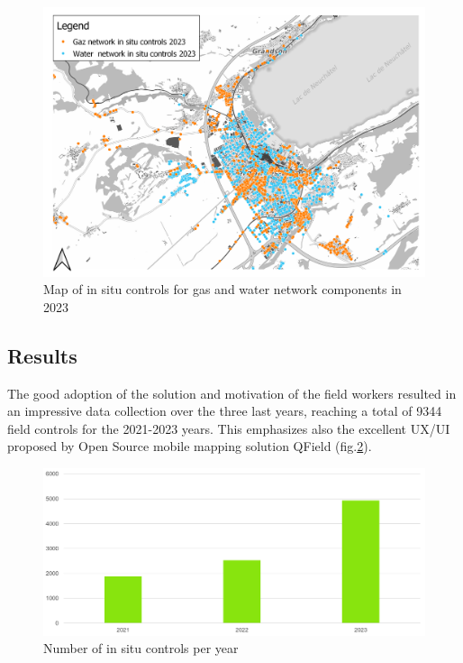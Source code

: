 \documentclass[runningheads]{llncs}
\begin{document}
\begin{figure}
	\includegraphics[width=\textwidth]{water_gas_2023.png}
	\caption{Map of in situ controls for gas and water network components in 2023} \label{fig1}
\end{figure}


\subsection{Results}

The good adoption of the solution and motivation of the field workers resulted in an impressive data collection over the three last years, reaching a total of 9344 field controls for the 2021-2023 years. This emphasizes also the excellent UX/UI proposed by Open Source mobile mapping solution QField\cite{ref_article3} (fig.\ref{fig2}).

\begin{figure}
	\includegraphics[width=\textwidth]{stats.png}
	\caption{Number of in situ controls per year} \label{fig2}
\end{figure}
\end{document}
